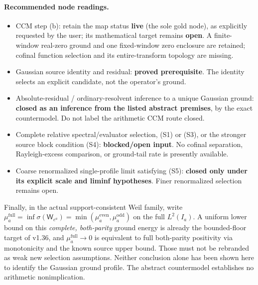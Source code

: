 \paragraph{Recommended node readings.}
\begin{itemize}
\item CCM step (b): retain the map status \textbf{live} (the sole gold
node), as explicitly requested by the user; its mathematical target remains
\textbf{open}. A finite-window real-zero ground and
one fixed-window zero enclosure are retained; cofinal function selection
and its entire-transform topology are missing.
\item Gaussian source identity and residual: \textbf{proved prerequisite}.
The identity selects an explicit candidate, not the operator's ground.
\item Absolute-residual / ordinary-resolvent inference to a unique
Gaussian ground: \textbf{closed as an inference from the listed abstract
premises}, by the exact countermodel. Do not label the arithmetic CCM
route closed.
\item Complete relative spectral/evaluator selection, (S1) or (S3), or
the stronger source block condition (S4): \textbf{blocked/open input}.
No cofinal separation, Rayleigh-excess comparison, or ground-tail rate
is presently available.
\item Coarse renormalized single-profile limit satisfying (S5):
\textbf{closed only under its explicit scale and liminf hypotheses}.
Finer renormalized selection remains open.
\end{itemize}
Finally, in the actual support-consistent Weil family, write
$\mu_a^{\mathrm{full}}=\inf\sigma(\mathsf W_{e^a})
=\min(\mu_a^{\mathrm{even}},\mu_a^{\mathrm{odd}})$ on the full
$L^2(I_a)$. A uniform lower bound on this \emph{complete, both-parity}
ground energy is already the bounded-floor
target of v1.36, and $\mu_a^{\mathrm{full}}\to0$ is equivalent to
full both-parity positivity
via monotonicity and the known source upper bound. Those must not be
rebranded as weak new selection assumptions. Neither conclusion alone
has been shown here to identify the Gaussian ground profile. The
abstract countermodel establishes no arithmetic nonimplication.
